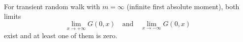 For transient random walk with \(m = \infty\) (infinite first absolute moment), both limits
\[
\lim_{x \to +\infty} G(0,x) \quad \text{and} \quad \lim_{x \to -\infty} G(0,x)
\]
exist and at least one of them is zero.
